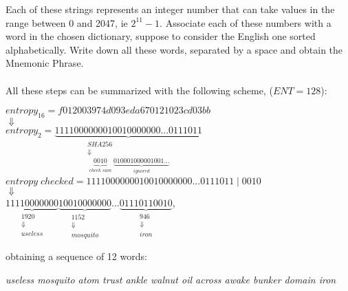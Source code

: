 Each of these strings represents an integer number that can take values in the range between 0 and 2047, ie $2^{11}-1$. Associate each of these numbers with a word in the chosen dictionary, suppose to consider the English one sorted alphabetically. Write down all these words, separated by a space and obtain the Mnemonic Phrase.
\\ \\
All these steps can be summarized with the following scheme, ($ENT=128$):
\begin{center} 
	$ entropy_{16} = f012003974d093eda670121023cd03bb $ 
	\\
	$\Downarrow $
	\\
	$entropy_{2}= \underbrace{1111000000010010000000...0111011}_{\substack{SHA256\\ \Downarrow\\ \underbrace{0010}_{\substack{check \;sum}}\underbrace{010001000001001...}_{\substack{ignored}}} } $
	\\
	$ $
	\\
	$entropy\;checked = 11110000000 10010000000...0111011\; | \; 0010$
	\\
	$\Downarrow $
	\\
	$\underbrace{11110000000}_{\substack{1920 \\ \Downarrow\\ useless} }
	\underbrace{10010000000}_{\substack{1152 \\ \Downarrow\\ mosquito}}
	...
	\underbrace{01110110010}_{\substack{946 \\ \Downarrow\\ iron}}
	$,
\end{center}
obtaining a sequence of 12 words:
\begin{center}
	\textit{useless mosquito atom trust ankle walnut oil across awake bunker domain iron}
\end{center}


